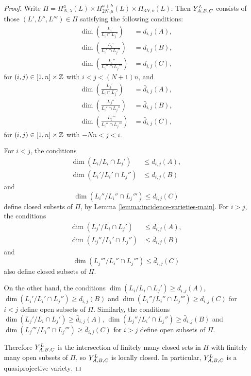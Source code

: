 \documentclass[a4paper, 11pt]{report}
\begin{document}
\begin{proof}
Write $\Pi=\Pi_{N,\lambda}^a(L)\times\Pi_{2N,\mu}^{a+b}(L)\times\Pi_{3N,\nu}(L)$. Then $\yprod[L]{A,B,C}$ consists of those $(L',L'',L''')\in\Pi$ satisfying the following conditions:
\begin{align}
\dim\left(\frac{L_i}{L_i\cap L_j'}\right) &= d_{i,j}{(A)},\\
\dim\left(\frac{L_i'}{L_i'\cap L_j''}\right) &= d_{i,j}{(B)},\\
\dim\left(\frac{L_i''}{L_i''\cap L_j'''}\right) &= d_{i,j}{(C)},
\end{align}
for $(i,j)\in [1,n]\times\integers$ with $i<j<(N+1)n$, and
\begin{align}
\dim\left(\frac{L_j'}{L_i\cap L_j'}\right) &= \bar{d}_{i,j}{(A)},\\
\dim\left(\frac{L_j''}{L_i'\cap L_j''}\right) &= \bar{d}_{i,j}{(B)},\\
\dim\left(\frac{L_j'''}{L_i''\cap L_j'''}\right) &= \bar{d}_{i,j}{(C)},
\end{align}
for $(i,j)\in [1,n]\times\integers$ with $-Nn<j<i$.

For $i<j$, the conditions
\begin{align*}
\dim\left(L_i/{L_i\cap L_j'}\right)&\le d_{i,j}{(A)},\\
\dim\left(L_i'/{L_i'\cap L_j''}\right)&\le d_{i,j}{(B)}
\end{align*}
and
\begin{equation*} 
\dim\left(L_i''/{L_i''\cap L_j'''}\right)\le d_{i,j}{(C)}
\end{equation*}
define closed subsets of $\Pi$, by Lemma \ref{lemma:incidence-varieties-main}. For $i>j$, the conditions
\begin{align*}
\dim\left(L_j'/{L_i\cap L_j'}\right)&\le \bar{d}_{i,j}{(A)},\\
\dim\left(L_j''/{L_i'\cap L_j''}\right)&\le \bar{d}_{i,j}{(B)}
\end{align*}
and
\begin{equation*}
\dim\left(L_j'''/{L_i''\cap L_j'''}\right)\le \bar{d}_{i,j}{(C)}
\end{equation*}
also define closed subsets of $\Pi$.

On the other hand, the conditions $\dim\left(L_i/{L_i\cap L_j'}\right)\geq d_{i,j}{(A)}$, $\dim\left(L_i'/{L_i'\cap L_j''}\right)\geq d_{i,j}{(B)}$ and $\dim\left(L_i''/{L_i''\cap L_j'''}\right)\geq d_{i,j}{(C)}$ for $i<j$ define open subsets of $\Pi$. Similarly, the conditions $\dim\left(L_j'/{L_i\cap L_j'}\right)\geq \bar{d}_{i,j}{(A)}$, $\dim\left(L_j''/{L_i'\cap L_j''}\right)\geq \bar{d}_{i,j}{(B)}$ and $\dim\left(L_j'''/{L_i''\cap L_j'''}\right)\geq \bar{d}_{i,j}{(C)}$ for $i>j$ define open subsets of $\Pi$.

Therefore $\yprod[L]{A,B,C}$ is the intersection of finitely many closed sets in $\Pi$ with finitely many open subsets of $\Pi$, so $\yprod[L]{A,B,C}$ is locally closed. In particular, $\yprod[L]{A,B,C}$ is a quasiprojective variety.
\end{proof}
\end{document}
